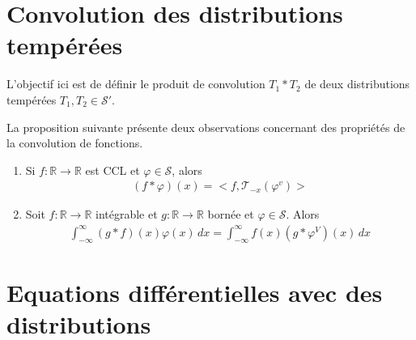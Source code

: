 \section{Convolution des distributions tempérées}
L'objectif ici est de définir le produit de convolution $T_1*T_2$ de deux distributions tempérées $T_1,T_2\in\mathcal S'$.

La proposition suivante présente deux observations concernant des propriétés de la convolution de fonctions.
\begin{myProposition}
	\begin{enumerate}
		\item Si $f:\mathbb R\rightarrow\mathbb R$ est CCL et $\varphi\in\mathcal S$, alors 
		\begin{eqnarray}
			(f*\varphi)(x)=<f,\mathcal T_{-x}(\varphi^v)>
		\end{eqnarray}
		\item Soit $f:\mathbb R\rightarrow\mathbb R$ intégrable et $g:\mathbb R\rightarrow\mathbb R$ bornée  et $\varphi\in\mathcal S$. Alors
		\begin{eqnarray}
			\int_{-\infty}^\infty(g*f)(x)\varphi(x)\,dx=\int_{-\infty}^\infty f(x)(g*\varphi^V)(x)\,dx 
		\end{eqnarray}
	\end{enumerate}
\end{myProposition} 

\section{Equations différentielles avec des distributions}

